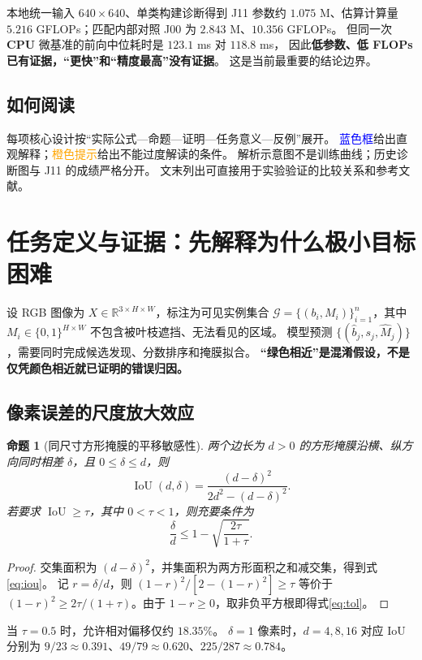 \documentclass[UTF8,a4paper,11pt,fontset=windows]{ctexart}
\newtheorem{proposition}{命题}[section]
\newcommand{\R}{\mathbb{R}}
\begin{document}
本地统一输入 \(640\times640\)、单类构建诊断得到 J11 参数约 \(1.075\) M、估算计算量
\(5.216\) GFLOPs；匹配内部对照 J00 为 \(2.843\) M、\(10.356\) GFLOPs。
但同一次 \textbf{CPU} 微基准的前向中位耗时是 \(123.1\) ms 对 \(118.8\) ms，
因此\textbf{低参数、低 FLOPs 已有证据，“更快”和“精度最高”没有证据}。
这是当前最重要的结论边界。

\subsection*{如何阅读}
每项核心设计按“实际公式—命题—证明—任务意义—反例”展开。
\textcolor{blue}{蓝色框}给出直观解释；\textcolor{orange}{橙色提示}给出不能过度解读的条件。
解析示意图不是训练曲线；历史诊断图与 J11 的成绩严格分开。
文末列出可直接用于实验验证的比较关系和参考文献。

\clearpage
\setcounter{tocdepth}{1}
\tableofcontents
\clearpage

\section{任务定义与证据：先解释为什么极小目标困难}
\label{sec:geometry}
设 RGB 图像为 \(X\in\R^{3\times H\times W}\)，标注为可见实例集合
\(\mathcal G=\{(b_i,M_i)\}_{i=1}^{n}\)，其中
\(M_i\in\{0,1\}^{H\times W}\) 不包含被叶枝遮挡、无法看见的区域。
模型预测 \(\{(\hat b_j,s_j,\hat M_j)\}\)，需要同时完成候选发现、分数排序和掩膜拟合。
\textbf{“绿色相近”是混淆假设，不是仅凭颜色相近就已证明的错误归因。}

\subsection{像素误差的尺度放大效应}
\begin{proposition}[同尺寸方形掩膜的平移敏感性]\label{prop:iou}
两个边长为 \(d>0\) 的方形掩膜沿横、纵方向同时相差 \(\delta\)，且
\(0\leq\delta\leq d\)，则
\begin{equation}
\operatorname{IoU}(d,\delta)
=\frac{(d-\delta)^2}{2d^2-(d-\delta)^2}.
\label{eq:iou}
\end{equation}
若要求 \(\operatorname{IoU}\geq\tau\)，其中 \(0<\tau<1\)，则充要条件为
\begin{equation}
\frac{\delta}{d}\leq 1-\sqrt{\frac{2\tau}{1+\tau}}.
\label{eq:tol}
\end{equation}
\end{proposition}
\begin{proof}
交集面积为 \((d-\delta)^2\)，并集面积为两方形面积之和减交集，得到式\eqref{eq:iou}。
记 \(r=\delta/d\)，则 \((1-r)^2/[2-(1-r)^2]\geq\tau\) 等价于
\((1-r)^2\geq2\tau/(1+\tau)\)。由于 \(1-r\geq0\)，取非负平方根即得式\eqref{eq:tol}。
\end{proof}
当 \(\tau=0.5\) 时，允许相对偏移仅约 \(18.35\%\)。
\(\delta=1\) 像素时，\(d=4,8,16\) 对应 IoU 分别为
\(9/23\approx0.391\)、\(49/79\approx0.620\)、\(225/287\approx0.784\)。
\end{document}
